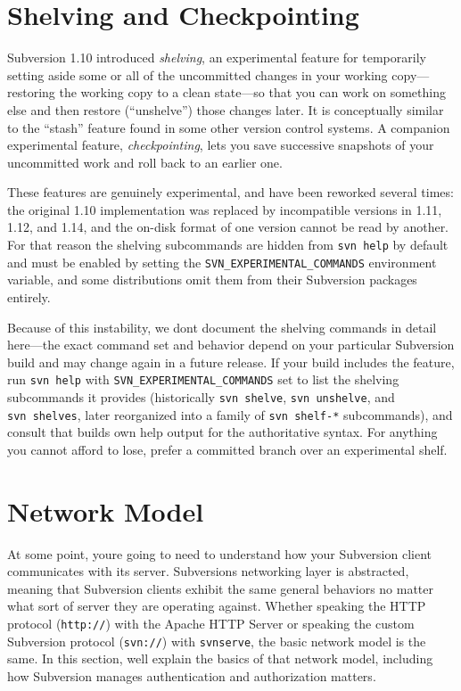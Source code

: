 \section{Shelving and Checkpointing}\label{svn.advanced.shelving}

Subversion 1.10 introduced \emph{shelving}, an experimental feature for
temporarily setting aside some or all of the uncommitted changes in your
working copy---restoring the working copy to a clean state---so that you
can work on something else and then restore (``unshelve'') those changes
later. It is conceptually similar to the ``stash'' feature found in some
other version control systems. A companion experimental feature,
\emph{checkpointing}, lets you save successive snapshots of your
uncommitted work and roll back to an earlier one.

These features are genuinely experimental, and have been reworked several
times: the original 1.10 implementation was replaced by incompatible
versions in 1.11, 1.12, and 1.14, and the on-disk format of one version
cannot be read by another. For that reason the shelving subcommands are
hidden from \texttt{svn\ help} by default and must be enabled by setting
the \texttt{SVN\_EXPERIMENTAL\_COMMANDS} environment variable, and some
distributions omit them from their Subversion packages entirely.

Because of this instability, we don\textquotesingle t document the
shelving commands in detail here---the exact command set and behavior
depend on your particular Subversion build and may change again in a
future release. If your build includes the feature, run \texttt{svn\ help}
with \texttt{SVN\_EXPERIMENTAL\_COMMANDS} set to list the shelving
subcommands it provides (historically \texttt{svn\ shelve},
\texttt{svn\ unshelve}, and \texttt{svn\ shelves}, later reorganized into
a family of \texttt{svn\ shelf-*} subcommands), and consult that
build\textquotesingle s own help output for the authoritative syntax. For
anything you cannot afford to lose, prefer a committed branch over an
experimental shelf.

\section{Network Model}\label{svn.serverconfig.netmodel}

At some point, you\textquotesingle re going to need to understand how
your Subversion client communicates with its server.
Subversion\textquotesingle s networking layer is abstracted, meaning
that Subversion clients exhibit the same general behaviors no matter
what sort of server they are operating against. Whether speaking the
HTTP protocol (\texttt{http://}) with the Apache HTTP Server or speaking
the custom Subversion protocol (\texttt{svn://}) with \texttt{svnserve},
the basic network model is the same. In this section,
we\textquotesingle ll explain the basics of that network model,
including how Subversion manages authentication and authorization
matters.

